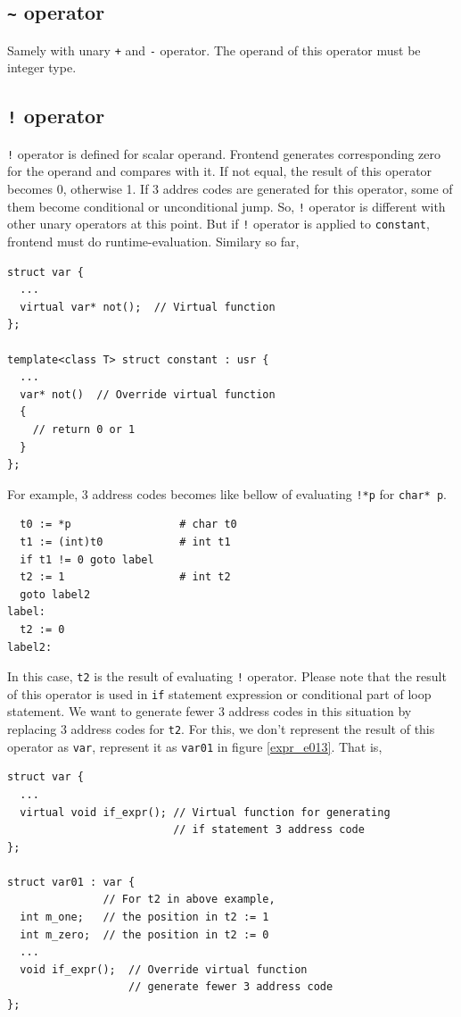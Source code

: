 \subsection{{\tt{\~{}}} operator}

Samely with unary {\tt{+}} and {\tt{-}} operator.
The operand of this operator must be integer type.

\subsection{{\tt{!}} operator}
\label{expr_e016}
{\tt{!}} operator is defined for scalar operand. Frontend generates
corresponding zero for the operand and compares with it. If not equal,
the result of this operator becomes 0, otherwise 1. If 3 addres codes
are generated for this operator, some of them become conditional or 
unconditional jump. So, {\tt{!}} operator is different with other unary
operators at this point. But if {\tt{!}} operator is applied to
{\tt{constant}}, frontend must do runtime-evaluation. Similary so far,
\begin{verbatim}
struct var {
  ...
  virtual var* not();  // Virtual function
};

template<class T> struct constant : usr {
  ...
  var* not()  // Override virtual function
  {
    // return 0 or 1
  }
};
\end{verbatim}
For example, 3 address codes becomes like bellow
of evaluating {\tt{!*p}} for {\tt{char* p}}.
\begin{verbatim}
  t0 := *p                 # char t0
  t1 := (int)t0            # int t1
  if t1 != 0 goto label
  t2 := 1                  # int t2
  goto label2
label:
  t2 := 0
label2:
\end{verbatim}
In this case, {\tt{t2}} is the result of evaluating {\tt{!}} operator.
Please note that the result of this operator is used in
{\tt{if}} statement expression or conditional part of loop statement.
We want to generate fewer 3 address codes in this situation
by replacing 3 address codes for {\tt{t2}}.
For this, we don't represent the result of this operator as {\tt{var}},
represent it as {\tt{var01}} in figure \ref{expr_e013}. That is,
\begin{verbatim}
struct var {
  ...
  virtual void if_expr(); // Virtual function for generating
                          // if statement 3 address code
};

struct var01 : var {
               // For t2 in above example,
  int m_one;   // the position in t2 := 1
  int m_zero;  // the position in t2 := 0
  ...
  void if_expr();  // Override virtual function
                   // generate fewer 3 address code
};
\end{verbatim}
